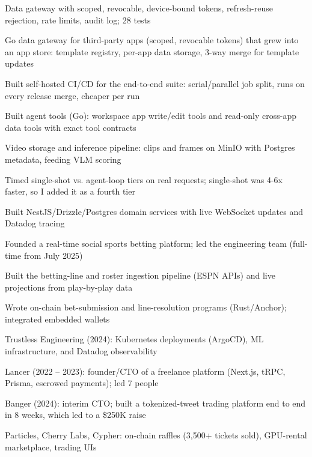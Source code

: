 \documentclass[print]{jack-resume}
\begin{document}
\begin{tightemize}
    \item Data gateway with scoped, revocable, device-bound tokens, refresh-reuse rejection, rate limits, audit log; 28 tests
    \item Go data gateway for third-party apps (scoped, revocable tokens) that grew into an app store: template registry, per-app data storage, 3-way merge for template updates
    \item Built self-hosted CI/CD for the end-to-end suite: serial/parallel job split, runs on every release merge, cheaper per run
    \item Built agent tools (Go): workspace app write/edit tools and read-only cross-app data tools with exact tool contracts
    \item Video storage and inference pipeline: clips and frames on MinIO with Postgres metadata, feeding VLM scoring
    \item Timed single-shot vs. agent-loop tiers on real requests; single-shot was 4-6x faster, so I added it as a fourth tier
\end{tightemize}
\sectionsep

\begin{tightemize}
    \item Built NestJS/Drizzle/Postgres domain services with live WebSocket updates and Datadog tracing
    \item Founded a real-time social sports betting platform; led the engineering team (full-time from July 2025)
    \item Built the betting-line and roster ingestion pipeline (ESPN APIs) and live projections from play-by-play data
    \item Wrote on-chain bet-submission and line-resolution programs (Rust/Anchor); integrated embedded wallets
\end{tightemize}
\sectionsep

\begin{tightemize}
    \item Trustless Engineering (2024): Kubernetes deployments (ArgoCD), ML infrastructure, and Datadog observability
    \item Lancer (2022 – 2023): founder/CTO of a freelance platform (Next.js, tRPC, Prisma, escrowed payments); led 7 people
    \item Banger (2024): interim CTO; built a tokenized-tweet trading platform end to end in 8 weeks, which led to a \$250K raise
    \item Particles, Cherry Labs, Cypher: on-chain raffles (3,500+ tickets sold), GPU-rental marketplace, trading UIs
\end{tightemize}
\sectionsep
\end{document}
